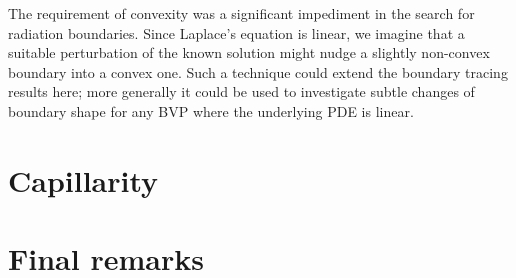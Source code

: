 The requirement of convexity was a significant impediment
in the search for radiation boundaries.
Since Laplace's equation is linear,
we imagine that a suitable perturbation of the known solution
might nudge a slightly non-convex boundary
into a convex one.
Such a technique could extend the boundary tracing results here;
more generally it could be used to investigate
subtle changes of boundary shape
for any BVP where the underlying PDE is linear.

\section{Capillarity}
\label{sec:concluding.capillarity}

\section{Final remarks}
\label{sec:concluding.final}
